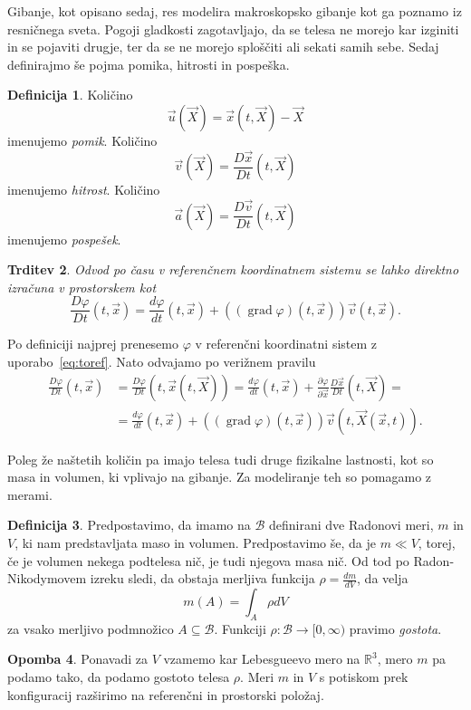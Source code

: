\documentclass[12pt,a4paper]{article}
\theoremstyle{definition} %
\newtheorem{definicija}{Definicija}[section]
\newtheorem{opomba}[definicija]{Opomba}
\theoremstyle{plain} %
\newtheorem{trditev}[definicija]{Trditev}
\numberwithin{equation}{section}
\newcommand{\R}{\mathbb R}
\newcommand{\B}{\mathcal{B}}
\newcommand{\grad}{\operatorname{grad}}
\renewcommand{\phi}{\varphi}
\newcommand{\dpar}[2]{\ensuremath{\frac{\partial #1}{\partial #2}}}
\newcommand{\dd}[2]{\ensuremath{\frac{d #1}{d #2}}}
\newcommand{\ddt}[1]{\dd{#1}{t}}
\newcommand{\DD}[2]{\ensuremath{\frac{D #1}{D #2}}}
\newcommand{\DDt}[1]{\DD{#1}{t}}
\newcommand{\vv}{\vec{v}}
\newcommand{\vu}{\vec{u}}
\newcommand{\va}{\vec{a}}
\newcommand{\vX}{\vec{X}}
\newcommand{\vx}{\vec{x}}
\begin{document}
Gibanje, kot opisano sedaj, res modelira makroskopsko gibanje kot ga poznamo iz
resničnega sveta. Pogoji gladkosti zagotavljajo, da se telesa ne morejo kar
izginiti in se pojaviti drugje, ter da se ne morejo sploščiti ali sekati samih
sebe. Sedaj definirajmo še pojma pomika, hitrosti in pospeška.

\begin{definicija}
  Količino \[ \vu(\vX) = \vx(t, \vX) - \vX \] imenujemo \emph{pomik}.
  Količino \[ \vv(\vX) = \DDt{\vx}(t, \vX) \] imenujemo \emph{hitrost}.
  Količino \[ \va(\vX) = \DDt{\vv}(t, \vX) \] imenujemo \emph{pospešek}.
\end{definicija}
\begin{trditev}
  Odvod po času v referenčnem koordinatnem sistemu se lahko direktno izračuna v
  prostorskem kot
  \[
  \DDt{\phi}(t, \vx) = \ddt{\phi}(t, \vx) + ((\grad \phi)(t, \vx)) \vv(t, \vx).
  \]
\end{trditev}
\proof
  Po definiciji najprej prenesemo $\phi$ v referenčni koordinatni sistem z
  uporabo~\ref{eq:toref}. Nato odvajamo po verižnem pravilu
  \begin{align*}
    \DDt \phi(t, \vx) &= \DDt \phi(t, \vx(t, \vX)) =
    \ddt \phi(t, \vx) + \dpar{\phi}{\vx} \DDt{\vx} (t, \vX) = \\
    &= \ddt \phi(t, \vx) + ((\grad \phi)(t, \vx)) \vv(t, \vX(\vx, t)).
  \end{align*}
\endproof

Poleg že naštetih količin pa imajo telesa tudi druge fizikalne lastnosti, kot so
masa in volumen, ki vplivajo na gibanje. Za modeliranje teh so pomagamo z
merami.

\begin{definicija}
  Predpostavimo, da imamo na $\B$ definirani dve Radonovi meri, $m$ in
  $V$, ki nam predstavljata maso in volumen. Predpostavimo še, da je $m \ll V$,
  torej, če je volumen nekega podtelesa nič, je tudi njegova masa nič. Od tod po
  Radon-Nikodymovem izreku sledi, da obstaja merljiva funkcija $\rho =
  \dd{m}{V}$, da velja
  \[
    m(A) = \int_{A} \rho dV
  \]
  za vsako merljivo podmnožico $A \subseteq \B$.
  Funkciji $\rho\colon\B\to[0, \infty)$ pravimo \emph{gostota}.
\end{definicija}
\begin{opomba}
  Ponavadi za $V$ vzamemo kar Lebesgueevo mero na $\R^3$, mero $m$ pa podamo tako, da
  podamo gostoto telesa $\rho$. Meri $m$ in $V$ s potiskom prek konfiguracij
  razširimo na referenčni in prostorski položaj.
\end{opomba}
\end{document}
